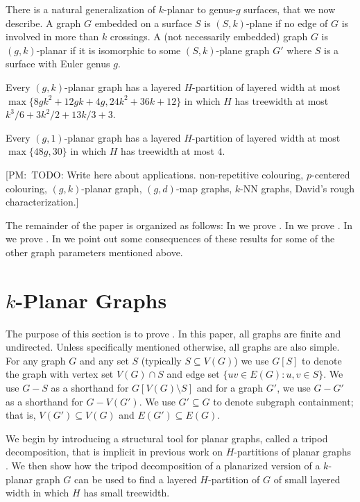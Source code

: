 \documentclass{patmorin}
\newcommand{\note}[2]{{\color{red}[#1:~#2]}}
\newcommand{\treewidth}{\ensuremath{k^3/6 + 3k^2/2 + 13k/3 + 3}}
\begin{document}
There is a natural generalization of $k$-planar to genus-$g$ surfaces, that we now describe.  A graph $G$ embedded on a surface $S$ is $(S,k)$-plane if no edge of $G$ is involved in more than $k$ crossings.  A (not necessarily embedded) graph $G$ is $(g,k)$-planar if it is isomorphic to some $(S,k)$-plane graph $G'$ where $S$ is a surface with Euler genus $g$.

\begin{thm}
  Every $(g,k)$-planar graph has a layered $H$-partition of layered width at most $\max\{8gk^2 + 12gk + 4g, 24k^2 + 36k + 12\}$ in which $H$ has treewidth at most $\treewidth$.
  
  Every $(g,1)$-planar graph has a layered $H$-partition of layered width at most $\max\{48g, 30\}$ in which $H$ has treewidth at most $4$.  
\end{thm}


\note{PM}{TODO: Write here about applications. non-repetitive colouring, $p$-centered colouring, $(g,k)$-planar graph, $(g,d)$-map graphs, $k$-NN graphs, David's rough characterization.}


The remainder of the paper is organized as follows: In  we prove .  In  we prove .  
In  we prove . In  we point out some consequences of these results for some of the other graph parameters mentioned above.


\section{$k$-Planar Graphs}

The purpose of this section is to prove .  In this paper, all graphs are finite and undirected. Unless specifically mentioned otherwise, all graphs are also simple.  For any graph $G$ and any set $S$ (typically $S\subseteq V(G)$) we use $G[S]$ to denote the graph with vertex set $V(G)\cap S$ and edge set $\{uv\in E(G) : u,v\in S\}$.  We use $G-S$ as a shorthand for $G[V(G)\setminus S]$ and for a graph $G'$, we use $G-G'$ as a shorthand for $G-V(G')$.  We use $G'\subseteq G$ to denote subgraph containment; that is, $V(G')\subseteq V(G)$ and $E(G')\subseteq E(G)$.

We begin by introducing a structural tool for planar graphs, called a tripod decomposition, that is implicit in previous work on $H$-partitions of planar graphs \cite{dujmovic.joret.ea:planar}.  We then show how the tripod decomposition of a planarized version of a $k$-planar graph $G$ can be used to find a layered $H$-partition of $G$ of small layered width in which $H$ has small treewidth. 
\end{document}
